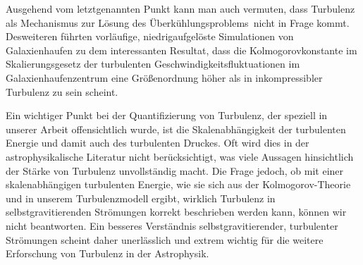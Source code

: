 Ausgehend vom letztgenannten Punkt kann man auch vermuten, dass Turbulenz als
Mechanismus zur Lösung des \glqq Überkühlungsproblems\grqq\ nicht in Frage
kommt. Desweiteren führten vorläufige, niedrigaufgelöste Simulationen von
Galaxienhaufen zu dem interessanten Resultat, dass die Kolmogorovkonstante im
Skalierungsgesetz der turbulenten Geschwindigkeitsfluktuationen im
Galaxienhaufenzentrum eine
Größenordnung höher als in inkompressibler Turbulenz zu sein scheint.

Ein wichtiger Punkt bei der Quantifizierung von Turbulenz, der speziell in
unserer Arbeit offensichtlich wurde, ist die Skalenabhängigkeit der turbulenten
Energie und damit auch des turbulenten Druckes. Oft wird dies in der
astrophysikalische Literatur nicht berücksichtigt, was viele Aussagen
hinsichtlich der Stärke von Turbulenz unvollständig macht.
Die Frage jedoch, ob mit einer skalenabhängigen turbulenten Energie, wie sie
sich aus der Kolmogorov-Theorie und in unserem Turbulenzmodell ergibt,
wirklich Turbulenz in selbstgravitierenden Strömungen korrekt beschrieben
werden kann, können wir nicht beantworten. Ein besseres Verständnis
selbstgravitierender, turbulenter Strömungen scheint daher unerlässlich und
extrem wichtig für die weitere Erforschung von Turbulenz in der Astrophysik.

